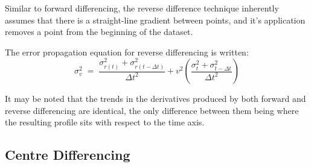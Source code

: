 \documentclass[namedreferences]{SolarPhysics}
\begin{document}
\begin{article}
Similar to forward differencing, the reverse difference technique inherently assumes that there is a straight-line gradient between points, and it's application removes a point from the beginning of the dataset. 

The error propagation equation for reverse differencing is written:
\begin{equation}
\sigma_v^2 \; = \; \frac{\sigma_{r(t)}^2+\sigma_{r(t-\Delta t)}^2}{\Delta t^2} + v^2 \left( \frac{\sigma_{t}^2+\sigma_{t-\Delta t}^2}{\Delta t^2} \right)
\end{equation}

It may be noted that the trends in the derivatives produced by both forward and reverse differencing are identical, the only difference between them being where the resulting profile sits with respect to the time axis.


\subsection{Centre Differencing}
\label{sect_centre}


\end{article}
\end{document}
